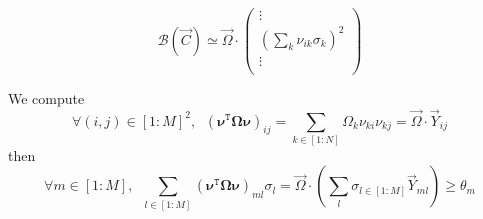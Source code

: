 \documentclass[aps,12pt]{revtex4}
\newcommand{\trn}[1]{{#1}^{\mathtt{T}}}
\begin{document}
\begin{equation}
	\mathcal{B}(\vec{C}) \simeq \vec{\Omega} \cdot
	\begin{pmatrix}
		\vdots\\
		(\sum_k \nu_{ik} \sigma_k)^2\\
		\vdots\\
	\end{pmatrix}
\end{equation}

We compute
\begin{equation}
	\forall (i,j) \in  [1:M]^2, \;\; (\trn{\bm{\nu}} \bm{\Omega} \bm{\nu} )_{ij} = \sum_{k\in[1:N]} \Omega_k \nu_{ki}\nu_{kj} = \vec{\Omega} \cdot \vec{Y}_{ij}
\end{equation}
then
\begin{equation}
	\forall m \in [1:M], \;\; \sum_{l\in[1:M]} (\trn{\bm{\nu}} \bm{\Omega} \bm{\nu} )_{ml} \sigma_l 
	= \vec{\Omega} \cdot \left( \sum_l\sigma_{l\in[1:M]} \vec{Y}_{ml} \right) \geq \theta_m
\end{equation}
\end{document}
